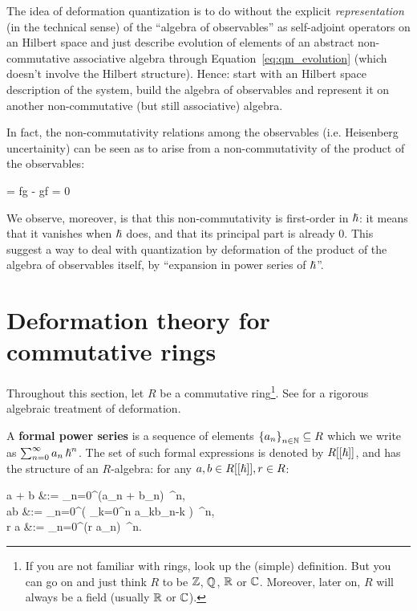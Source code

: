 The idea of deformation quantization is to do without the explicit \emph{representation} (in the technical sense) of the ``algebra of observables'' as self-adjoint operators on an Hilbert space and just describe evolution of elements of an abstract non-commutative associative algebra through Equation~\eqref{eq:qm_evolution} (which doesn't involve the Hilbert structure). Hence: start with an Hilbert space description of the system, build the algebra of observables and represent it on another non-commutative (but still associative) algebra.

In fact, the non-commutativity relations among the observables (i.e. Heisenberg uncertainity) can be seen as to arise from a non-commutativity of the product of the observables:
\begin{eqalign}
	[f,g] = fg - gf = 0 \iff {}
\end{eqalign}
We observe, moreover, is that this non-commutativity is first-order in ${\boldsymbol\hslash}$: it means that it vanishes when ${\boldsymbol\hslash}$ does, and that its principal part is already $0$. This suggest a way to deal with quantization by deformation of the product of the algebra of observables itself, by ``expansion in power series of ${\boldsymbol\hslash}$''.

\section{Deformation theory for commutative rings}
Throughout this section, let $R$ be a commutative ring\footnote{If you are not familiar with rings, look up the (simple) definition. But you can go on and just think $R$ to be $\mathbb{Z}$, $\mathbb{Q}$, $\mathbb{R}$ or $\mathbb{C}$. Moreover, later on, $R$ will always be a field (usually $\mathbb{R}$ or $\mathbb{C}$).}. See \cite{gerstenhaber1964deformation} for a rigorous algebraic treatment of deformation.

\begin{definition}
	A \textbf{formal power series} is a sequence of elements $\left\{a_{n}\right\}_{n \in \mathbb{N}} \subseteq R$ which we write as $\sum_{n=0}^\infty a_n\, {\boldsymbol\hslash}^n$. The set of such formal expressions is denoted by $R[[{\boldsymbol\hslash}]]$, and has the structure of an $R$-algebra: for any $a,b \in R[[{\boldsymbol\hslash}]], r \in R$:
	\begin{eqalign}
		a + b &:= \sum_{n=0}^\infty (a_n + b_n)\, \planck^n,\\
		\label{eq:power_series_product}
		ab &:= \sum_{n=0}^\infty \left( \sum_{k=0}^n a_kb_{n-k} \right) \,\planck^n,\\
		r \cdot a &:= \sum_{n=0}^\infty (r \cdot a_n) \,\planck^n.
	\end{eqalign}
\end{definition}

